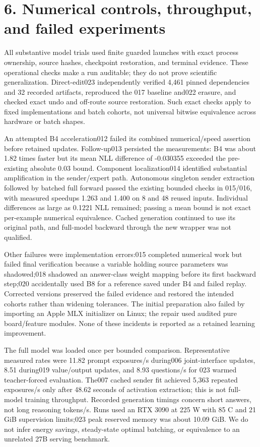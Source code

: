 \documentclass[11pt]{article}
\begin{document}
\section*{6. Numerical controls, throughput, and failed experiments}
All substantive model trials used finite guarded launches with exact process ownership, source hashes, checkpoint restoration, and terminal evidence. These operational checks make a run auditable; they do not prove scientific generalization. Direct-edit023 independently verified 4,461 pinned dependencies and 32 recorded artifacts, reproduced the 017 baseline and022 erasure, and checked exact undo and off-route source restoration. Such exact checks apply to fixed implementations and batch cohorts, not universal bitwise equivalence across hardware or batch shapes.

An attempted B4 acceleration012 failed its combined numerical/speed assertion before retained updates. Follow-up013 persisted the measurements: B4 was about 1.82 times faster but its mean NLL difference of -0.030355 exceeded the pre-existing absolute 0.03 bound. Component localization014 identified substantial amplification in the sender/expert path. Autonomous singleton sender extraction followed by batched full forward passed the existing bounded checks in 015/016, with measured speedups 1.263 and 1.400 on 8 and 48 reused inputs. Individual differences as large as 0.1221 NLL remained; passing a mean bound is not exact per-example numerical equivalence. Cached generation continued to use its original path, and full-model backward through the new wrapper was not qualified.

Other failures were implementation errors:015 completed numerical work but failed final verification because a variable holding source parameters was shadowed;018 shadowed an answer-class weight mapping before its first backward step;020 accidentally used B8 for a reference saved under B4 and failed replay. Corrected versions preserved the failed evidence and restored the intended cohorts rather than widening tolerances. The initial preparation also failed by importing an Apple MLX initializer on Linux; the repair used audited pure board/feature modules. None of these incidents is reported as a retained learning improvement.

The full model was loaded once per bounded comparison. Representative measured rates were 11.82 prompt exposures/s during006 joint-interface updates, 8.51 during019 value/output updates, and 8.93 questions/s for 023 warmed teacher-forced evaluation. The007 cached sender fit achieved 5,363 repeated exposures/s only after 48.62 seconds of activation extraction; this is not full-model training throughput. Recorded generation timings concern short answers, not long reasoning tokens/s. Runs used an RTX 3090 at 225 W with 85 C and 21 GiB supervision limits;023 peak reserved memory was about 10.09 GiB. We do not infer energy savings, steady-state optimal batching, or equivalence to an unrelated 27B serving benchmark.
\end{document}
